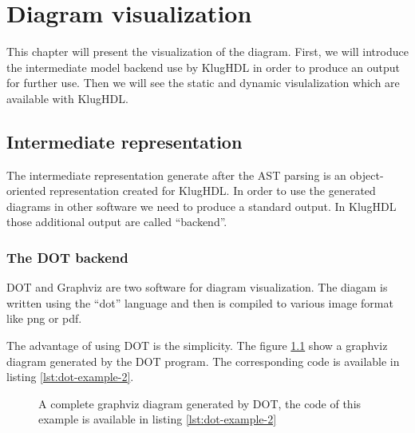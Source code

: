 \chapter{Diagram visualization}
\label{chap:diagram-visualization}

This chapter will present the visualization of the diagram. First, we will
introduce the intermediate model backend use by KlugHDL in order to produce an
output for further use. Then we will see the static and dynamic visulalization
which are available with KlugHDL.

\section{Intermediate representation}
\label{sec:intermediate-representation}

The intermediate representation generate after the AST parsing is an
object-oriented representation created for KlugHDL. In order to use the
generated diagrams in other software we need to produce a standard output. In
KlugHDL those additional output are called ``backend''.

\subsection{The DOT backend}
\label{sec:dot-backend}

DOT and Graphviz are two software for diagram visualization. The diagam is
written using the ``dot'' language and then is compiled to various image format
like png or pdf.

The advantage of using DOT is the simplicity. The figure \ref{fig:dot-example-2}
show a graphviz diagram generated by the DOT program. The corresponding code is
available in listing \ref{lst:dot-example-2}.

\begin{figure}[H]
  \centering
  \caption[Example of a Graphviz diagram]{A complete graphviz diagram generated
    by DOT, the code of this example is available in listing \ref{lst:dot-example-2}}
  \label{fig:dot-example-2}
\end{figure}

